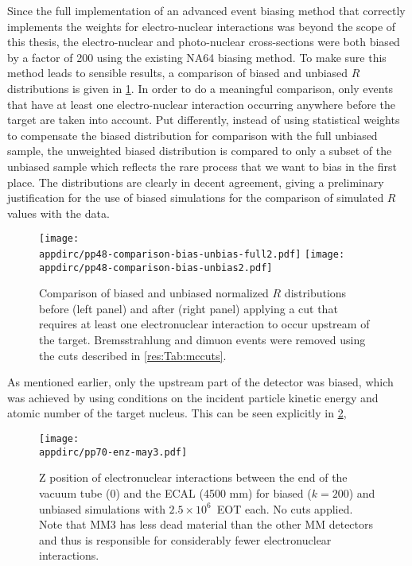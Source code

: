 Since the full implementation of an advanced event biasing method that correctly implements the weights for electro-nuclear interactions was beyond the scope of this thesis, the electro-nuclear and photo-nuclear cross-sections were both biased by a factor of 200 using the existing NA64 biasing method. To make sure this method leads to sensible results, a comparison of biased and unbiased $R$ distributions is given in \ref{res:fig:biascomp}. In order to do a meaningful comparison, only events that have at least one electro-nuclear interaction occurring anywhere before the target are taken into account. Put differently, instead of using statistical weights to compensate the biased distribution for comparison with the full unbiased sample, the unweighted biased distribution is compared to only a subset of the unbiased sample which reflects the rare process that we want to bias in the first place. The distributions are clearly in decent agreement, giving a preliminary justification for the use of biased simulations for the comparison of simulated $R$ values with the data.
%
\begin{figure}[htb]
    \centering
    \texttt{[image: \\appdirc/pp48-comparison-bias-unbias-full2.pdf]}
    \texttt{[image: \\appdirc/pp48-comparison-bias-unbias2.pdf]}
    \caption[Comparison of biased and unbiased $R$ distributions.]{Comparison of biased and unbiased normalized $R$ distributions before (left panel) and after (right panel) applying a cut that requires at least one electronuclear interaction to occur upstream of the target. Bremsstrahlung and dimuon events were removed using the cuts described in \ref{res:Tab:mccuts}.}
  \label{res:fig:biascomp}
\end{figure}

As mentioned earlier, only the upstream part of the detector was biased, which was achieved by using conditions on the incident particle kinetic energy and atomic number of the target nucleus. This can be seen explicitly in \ref{res:fig:enz},
%
\begin{figure}[htb]
  \centering
  \texttt{[image: \\appdirc/pp70-enz-may3.pdf]}
  \caption[Histograms of the z position of electronuclear interactions.]{Z position of electronuclear interactions between the end of the vacuum tube (0) and the ECAL (4500 mm) for biased ($k=200$) and unbiased simulations with $2.5\times10^6$~EOT each. No cuts applied. Note that MM3 has less dead material than the other MM detectors and thus is responsible for considerably fewer electronuclear interactions.}
  \label{res:fig:enz}
\end{figure}

